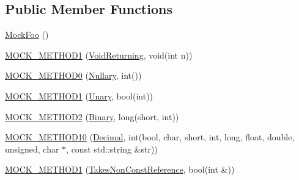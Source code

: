 \subsection*{Public Member Functions}
\begin{DoxyCompactItemize}
\item 
\mbox{\hyperlink{classtesting_1_1gmock__generated__function__mockers__test_1_1MockFoo_a05d4aeb00d75b5dbf627a5db2c0ada7f}{Mock\+Foo}} ()
\item 
\mbox{\hyperlink{classtesting_1_1gmock__generated__function__mockers__test_1_1MockFoo_a03e7f723e9909b031fc6df22f41aac7f}{M\+O\+C\+K\+\_\+\+M\+E\+T\+H\+O\+D1}} (\mbox{\hyperlink{classtesting_1_1gmock__generated__function__mockers__test_1_1FooInterface_adf968115cf1260004d8abe372dc71c85}{Void\+Returning}}, void(int n))
\item 
\mbox{\hyperlink{classtesting_1_1gmock__generated__function__mockers__test_1_1MockFoo_a25b99ec3b994318b7ecb0578da113136}{M\+O\+C\+K\+\_\+\+M\+E\+T\+H\+O\+D0}} (\mbox{\hyperlink{classtesting_1_1gmock__generated__function__mockers__test_1_1FooInterface_a633e753eafa7f82dde22ecf9492f341c}{Nullary}}, int())
\item 
\mbox{\hyperlink{classtesting_1_1gmock__generated__function__mockers__test_1_1MockFoo_a9f9ce709a5b13e319eeb348e6eae3d18}{M\+O\+C\+K\+\_\+\+M\+E\+T\+H\+O\+D1}} (\mbox{\hyperlink{classtesting_1_1gmock__generated__function__mockers__test_1_1FooInterface_ae0885ac29bc4a3f180f6573d8b1a341e}{Unary}}, bool(int))
\item 
\mbox{\hyperlink{classtesting_1_1gmock__generated__function__mockers__test_1_1MockFoo_a50f8c94d6fab258d49e1d4a15ea7a7af}{M\+O\+C\+K\+\_\+\+M\+E\+T\+H\+O\+D2}} (\mbox{\hyperlink{classtesting_1_1gmock__generated__function__mockers__test_1_1FooInterface_a59ea28b711ece054ce9d57c2dc574ba0}{Binary}}, long(short, int))
\item 
\mbox{\hyperlink{classtesting_1_1gmock__generated__function__mockers__test_1_1MockFoo_ab0a37a844eb43c36ca45cff5274bd9e9}{M\+O\+C\+K\+\_\+\+M\+E\+T\+H\+O\+D10}} (\mbox{\hyperlink{classtesting_1_1gmock__generated__function__mockers__test_1_1FooInterface_a5a389017205848c7b7055c071cca0c6d}{Decimal}}, int(bool, char, short, int, long, float, double, unsigned, char $\ast$, const std\+::string \&str))
\item 
\mbox{\hyperlink{classtesting_1_1gmock__generated__function__mockers__test_1_1MockFoo_a785cbef820189a974170cea52b0d97d9}{M\+O\+C\+K\+\_\+\+M\+E\+T\+H\+O\+D1}} (\mbox{\hyperlink{classtesting_1_1gmock__generated__function__mockers__test_1_1FooInterface_a694354adfffcee58093298bc12182ff5}{Takes\+Non\+Const\+Reference}}, bool(int \&))

\end{DoxyCompactItemize}
